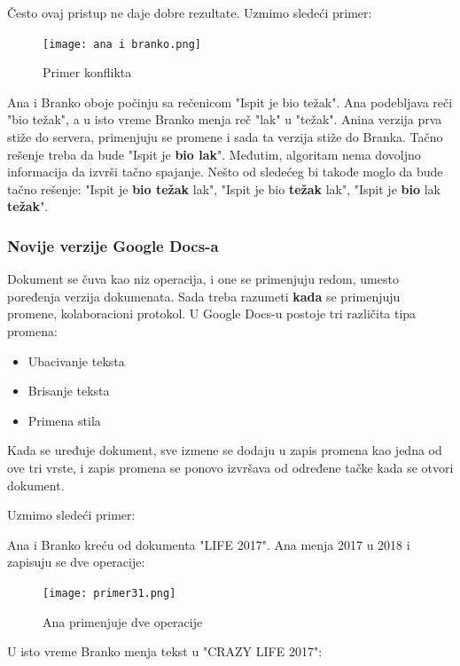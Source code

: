 \documentclass[12pt]{article}
\begin{document}
Često ovaj pristup ne daje dobre rezultate. Uzmimo sledeći primer:

\begin{figure}[h]
	\centering
	\texttt{[image: ana i branko.png]}
	\caption{Primer konflikta}
	
\end{figure}

Ana i Branko oboje počinju sa rečenicom "Ispit je bio težak". Ana podebljava reči "bio težak", a u isto vreme Branko menja reč "lak" u "težak". Anina verzija prva stiže do servera, primenjuju se promene i sada ta verzija stiže do Branka. Tačno rešenje treba da bude "Ispit je \textbf{bio lak}". Međutim, algoritam nema dovoljno informacija da izvrši tačno spajanje. Nešto od sledećeg bi takođe moglo da bude tačno rešenje: "Ispit je \textbf{bio težak} lak", "Ispit je bio \textbf{težak} lak", "Ispit je  \textbf{bio} lak \textbf{težak}".

\subsubsection{Novije verzije Google Docs-a}

Dokument se čuva kao niz operacija, i one se primenjuju redom, umesto poređenja verzija dokumenata. Sada treba razumeti \textbf{kada} se primenjuju promene, kolaboracioni protokol. U Google Docs-u postoje tri različita tipa promena:

\begin{itemize}
	\item Ubacivanje teksta
	\item Brisanje teksta
	\item Primena stila
\end{itemize}

Kada se uređuje dokument, sve izmene se dodaju u zapis promena kao jedna od ove tri vrste, i zapis promena se ponovo izvršava od određene tačke kada se otvori dokument.

Uzmimo sledeći primer:

Ana i Branko kreću od dokumenta "LIFE 2017". Ana menja 2017 u 2018 i zapisuju se dve operacije:

\begin{figure}[H]
	\centering
	\texttt{[image: primer31.png]}
	\caption{Ana primenjuje dve operacije}
	
\end{figure}

U isto vreme Branko menja tekst u "CRAZY LIFE 2017":
\end{document}
